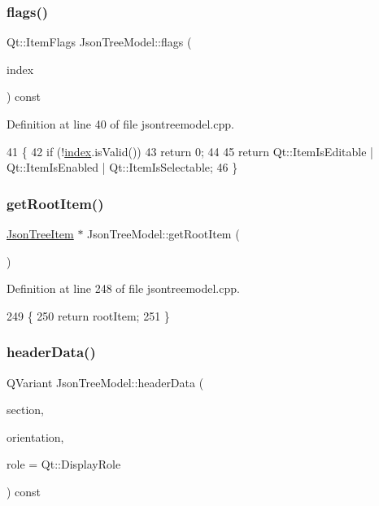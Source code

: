 \subsubsection{\texorpdfstring{flags()}{flags()}}
{\footnotesize\ttfamily Qt\+::\+Item\+Flags Json\+Tree\+Model\+::flags (\begin{DoxyParamCaption}\item[{const Q\+Model\+Index \&}]{index }\end{DoxyParamCaption}) const}



Definition at line 40 of file jsontreemodel.\+cpp.


\begin{DoxyCode}
41 \{
42     \textcolor{keywordflow}{if} (!\hyperlink{class_json_tree_model_ac8be89cc178ef5151479be23006d18e3}{index}.isValid())
43         \textcolor{keywordflow}{return} 0;
44 
45     \textcolor{keywordflow}{return} Qt::ItemIsEditable | Qt::ItemIsEnabled | Qt::ItemIsSelectable;
46 \}
\end{DoxyCode}
\mbox{\label{class_json_tree_model_a2c9c8c6a1feb5de57d38d808061a6482}} 
\subsubsection{\texorpdfstring{get\+Root\+Item()}{getRootItem()}}
{\footnotesize\ttfamily \hyperlink{class_json_tree_item}{Json\+Tree\+Item} $\ast$ Json\+Tree\+Model\+::get\+Root\+Item (\begin{DoxyParamCaption}{ }\end{DoxyParamCaption})}



Definition at line 248 of file jsontreemodel.\+cpp.


\begin{DoxyCode}
249 \{
250     \textcolor{keywordflow}{return} rootItem;
251 \}
\end{DoxyCode}
\mbox{\label{class_json_tree_model_ac7bebf8fa62b65a6bed96dba108c00a0}} 
\subsubsection{\texorpdfstring{header\+Data()}{headerData()}}
{\footnotesize\ttfamily Q\+Variant Json\+Tree\+Model\+::header\+Data (\begin{DoxyParamCaption}\item[{int}]{section,  }\item[{Qt\+::\+Orientation}]{orientation,  }\item[{int}]{role = {\ttfamily Qt\+:\+:DisplayRole} }\end{DoxyParamCaption}) const}



